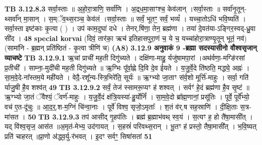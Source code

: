 \documentclass[17pt]{extarticle}
\begin{document}
{{{{{{{{{{{{{{{{{{{{{{{                  \newline
                                \textbf{ TB 3.12.8.3} \newline
                  सर्वा॒स्ताः ॥ अ॒हो॒रा॒त्राणि॒ सर्वा॑णि । अ॒द्र्ध॒मा॒साꣳश्च॒ केव॑लान् ।सर्वा॒स्ताः ॥ सर्वा॑नृ॒तून्-थ्सर्वा᳚न् मा॒सान् । स॒म्ॅव॒थ्स॒रञ्च॒ केव॑लं ।सर्वा॒स्ताः ॥ सर्वं॒ भूतꣳ॒॒ सर्वं॒ भव्यं᳚ । यच्चा॒तोऽधि॑ भवि॒ष्यति॑ । सर्वा॒स्ता इष्ट॑काः कृ॒त्वा ( ) । उप॑ काम॒दुघा॑ दधे । तेनर्.षि॑णा॒ तेन॒ ब्रह्म॑णा । तया॑ दे॒वत॑या-ऽङ्गिर॒स्वद्-ध्रु॒वा सी॑द । \textbf{ 48} \newline
                  \newline
                                                        \textbf{special korvai} \newline
              (दिवं॒ तार॑का॒ ऋच॑ इतिहासपुरा॒णं च॒ ये च॒ यच्चा॑होरा॒त्राण्यृ॒तून् भूतं॒ नव॑) \newline
                                (सामा॑नि - ब्र॒ह्मन् प्रति॑ष्ठितं - कृ॒त्वा त्रीणि॑ च) \textbf{(A8)} \newline \newline
                \textbf{ 3.12.9    अनुवाकं   9 -ब्रह्मा सदस्यासीनो वौश्वसृजान् व्याचष्टे} \newline
                                \textbf{ TB 3.12.9.1} \newline
                  ऋ॒चां प्राची॑ मह॒ती दिगु॑च्यते । दक्षि॑णा-माहु॒ र्यजु॑षामपा॒रां ।अथ॑र्वणा॒-मग्ङि॑रसां प्र॒तीची᳚ । साम्ना॒-मुदी॑ची मह॒ती दिगु॑च्यते ॥ ऋ॒ग्भिः पू᳚र्वा॒ह्णे दि॒वि दे॒व ई॑यते । य॒जु॒र्वे॒दे ति॑ष्ठति॒ मद्ध्ये॒ अह्नः॑ ।सा॒म॒वे॒दे-ना᳚स्तम॒ये मही॑यते । वेदै॒-रशू᳚न्य-स्त्रि॒भिरे॑ति॒ सूर्यः॑ ॥ ऋ॒ग्भ्यो जा॒ताꣳ स॑र्व॒शो मूर्त्ति॑-माहुः । सर्वा॒ गति॑ र्याजु॒षी है॒व शश्व॑त् \textbf{ 49} \newline
                  \newline
                                \textbf{ TB 3.12.9.2} \newline
                  सर्वं॒ तेज॑ स्सामरू॒प्यꣳ ह॑ शश्वत् । सर्वꣳ॑ हे॒दं ब्रह्म॑णा है॒व सृ॒ष्टं ॥ ऋ॒ग्भ्यो जा॒तं ॅवैश्यं॒ ॅवर्ण॑-माहुः । य॒जु॒र्वे॒दं क्ष॑त्रि॒यस्या॑-हु॒र्योनिं᳚ । सा॒म॒वे॒दो ब्रा᳚ह्म॒णानां॒ प्रसू॑तिः । पूर्वे॒ पूर्वे᳚भ्यो॒ वच॑ ए॒त-दू॑चुः ॥ आ॒द॒र्॒.श-म॒ग्निं चि॑न्वा॒नाः । पूर्वे॑ विश्व॒ सृजो॒ऽमृताः᳚ । श॒तं व॑र्.ष सह॒स्राणि॑ । दी॒क्षि॒ताः स॒त्र-मा॑सत । \textbf{ 50} \newline
                  \newline
                                \textbf{ TB 3.12.9.3} \newline
                  तप॑ आसीद् गृ॒हप॑तिः । ब्रह्म॑ ब्र॒ह्माभ॑वथ् स्व॒यं । स॒त्यꣳ ह॒ हो तै॑षा॒मासी᳚त् । यद् वि॑श्व॒सृज॒ आस॑त ॥अ॒मृत॑-मेभ्य॒ उद॑गायत् । स॒हस्रं॑ परिवथ्स॒रान् । भू॒तꣳ ह॑ प्रस्तो॒ तैषा॒मासी᳚त् । भ॒वि॒ष्यत् प्रति॑ चाहरत् ॥प्रा॒णो अ॑द्ध्व॒र्यु-र॑भवत् । इ॒दꣳ सर्वꣳ॒॒ सिषा॑सतां \textbf{ 51} \newline
}}}}}}}}}}}}}}}}}}}}}}}
\end{document}
